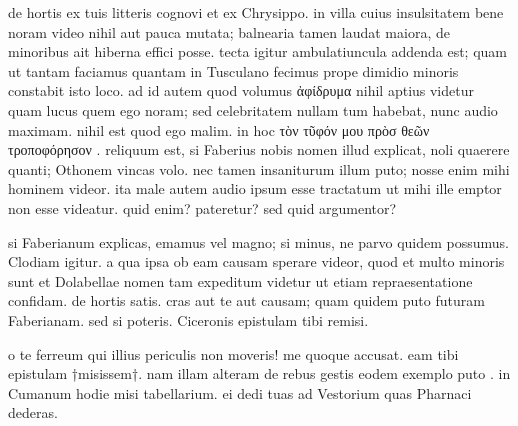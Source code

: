 


 de hortis ex tuis litteris cognovi et ex Chrysippo. in villa cuius insulsitatem bene noram video nihil aut pauca mutata; balnearia tamen laudat maiora, de minoribus ait hiberna effici posse. tecta igitur ambulatiuncula addenda est; quam ut tantam faciamus quantam in Tusculano fecimus prope dimidio minoris constabit isto loco. ad id autem quod volumus ἀφίδρυμα nihil aptius videtur quam lucus quem ego noram; sed celebritatem nullam tum habebat, nunc audio maximam. nihil est quod ego malim. in hoc τὸν τῦφόν μου πρὸσ θεῶν τροποφόρησον . reliquum est, si Faberius nobis nomen illud explicat, noli quaerere quanti; Othonem vincas volo. nec tamen insaniturum illum puto; nosse enim mihi hominem videor. ita male autem audio ipsum esse tractatum ut mihi ille emptor non esse videatur. quid enim? pateretur? sed quid argumentor?

 si Faberianum explicas, emamus vel magno; si minus, ne parvo quidem possumus. Clodiam igitur. a qua ipsa ob eam causam sperare videor, quod et multo minoris sunt et Dolabellae nomen tam expeditum videtur ut etiam repraesentatione confidam. de hortis satis. cras aut te aut causam; quam quidem puto futuram Faberianam. sed si poteris. Ciceronis epistulam tibi remisi.

 o te ferreum qui illius periculis non moveris! me quoque accusat. eam tibi epistulam †misissem†. nam illam alteram de rebus gestis eodem exemplo puto . in Cumanum hodie misi tabellarium. ei dedi tuas ad Vestorium quas Pharnaci dederas.
